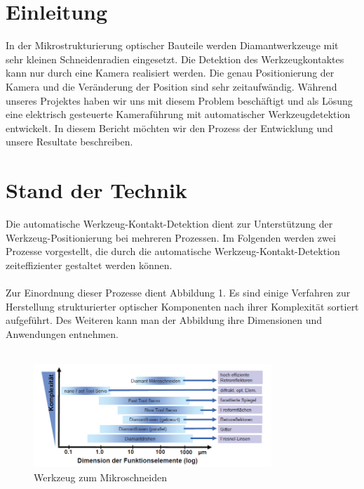 \documentclass[12pt,a4paper,bibliography=totocnumbered,listof=totocnumbered]{scrartcl}
\begin{document}
\onehalfspacing
\renewcommand{\thesection}{\arabic{section}}
\renewcommand{\theHsection}{\arabic{section}}
\setcounter{section}{0}
\setcounter{page}{1}

\section{Einleitung}
In der Mikrostrukturierung optischer Bauteile werden Diamantwerkzeuge mit sehr kleinen Schneidenradien eingesetzt. Die Detektion des Werkzeugkontaktes kann nur durch eine Kamera realisiert werden. Die genau Positionierung der Kamera und die Veränderung der Position sind sehr zeitaufwändig. Während unseres Projektes haben wir uns mit diesem Problem beschäftigt und als Lösung eine elektrisch gesteuerte Kameraführung mit automatischer Werkzeugdetektion entwickelt. In diesem Bericht möchten wir den Prozess der Entwicklung und unsere Resultate beschreiben. 

\section{Stand der Technik}
Die automatische Werkzeug-Kontakt-Detektion dient zur Unterstützung der Werkzeug-Positionierung bei mehreren Prozessen. Im Folgenden werden zwei Prozesse vorgestellt, die durch die automatische Werkzeug-Kontakt-Detektion zeiteffizienter gestaltet werden können. \\ \\
Zur Einordnung dieser Prozesse dient Abbildung 1. Es sind einige Verfahren zur Herstellung strukturierter optischer Komponenten nach ihrer Komplexität sortiert aufgeführt. Des Weiteren kann man der Abbildung ihre Dimensionen und Anwendungen entnehmen. \\ \\ 
\begin{figure}[htbp]
\centering 
\includegraphics[width=0.8\textwidth]{Fertigungsverfahren.PNG}
\caption[Gla09]{Werkzeug zum Mikroschneiden}
\label{fig:Bild1}
\end{figure}
\break
\end{document}

